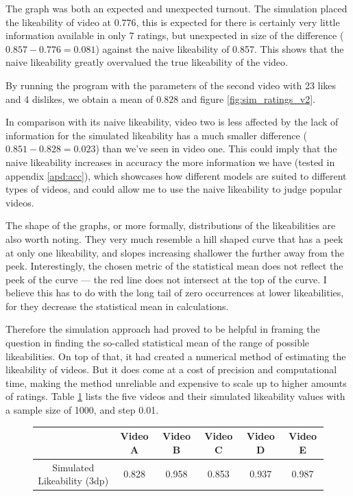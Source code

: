 \documentclass[a4paper,11pt]{article}
\begin{document}
The graph was both an expected and unexpected turnout. The simulation placed the likeability of video at $0.776$, this is expected for there is certainly very little information available in only 7 ratings, but unexpected in size of the difference ($0.857-0.776=0.081$) against the naive likeability of 0.857. This shows that the naive likeability greatly overvalued the true likeability of the video.

By running the program with the parameters of the second video with 23 likes and 4 dislikes,
we obtain a mean of $0.828$ and figure \ref{fig:sim_ratings_v2}.

In comparison with its naive likeability, video two is less affected by the lack of information for the simulated likeability has a much smaller difference ($0.851-0.828=0.023$) than we've seen in video one. This could imply that the naive likeability increases in accuracy the more information we have (tested in appendix \ref{apd:acc}), which showcases how different models are suited to different types of videos, and could allow me to use the naive likeability to judge popular videos.

The shape of the graphs, or more formally, distributions of the likeabilities are also worth noting. They very much resemble a hill shaped curve that has a peek at only one likeability, and slopes increasing shallower the further away from the peek. Interestingly, the chosen metric of the statistical mean does not reflect the peek of the curve --- the red line does not intersect at the top of the curve. I believe this has to do with the long tail of zero occurrences at lower likeabilities, for they decrease the statistical mean in calculations.

Therefore the simulation approach had proved to be helpful in framing the question in finding the so-called statistical mean of the range of possible likeabilities. On top of that, it had created a numerical method of estimating the likeability of videos. But it does come at a cost of precision and computational time, making the method unreliable and expensive to scale up to higher amounts of ratings. Table \ref{tbl:simulation} lists the five videos and their simulated likeability values with a sample size of 1000, and step 0.01.

\begin{figure}[H]
    \centering
    \begin{tabular}{c|c|c|c|c|c}
        & Video A & Video B & Video C & Video D & Video E \\
        \hline
        \hline
        Simulated Likeability (3dp) & 0.828 & 0.958 &  0.853 & 0.937 & 0.987
    \end{tabular}
    \label{tbl:simulation}
\end{figure}
\end{document}
